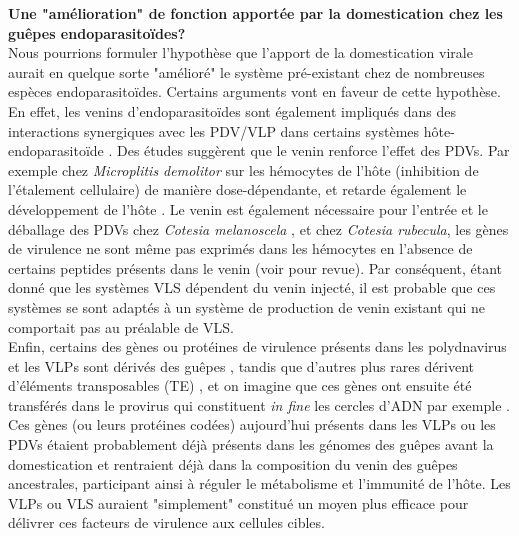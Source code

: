 \textbf{Une "amélioration" de fonction apportée par la domestication chez les guêpes endoparasitoïdes?}\\
Nous pourrions formuler l'hypothèse que l'apport de la domestication virale aurait en quelque sorte "amélioré" le système pré-existant chez de nombreuses espèces endoparasitoïdes. Certains arguments vont en faveur de cette hypothèse. En effet, les venins d'endoparasitoïdes sont également impliqués dans des interactions synergiques avec les PDV/VLP dans certains systèmes hôte-endoparasitoïde \citep{asgari_venom_2006,asgari_venom_2011,schmidt_innate_2001}. Des études suggèrent que le venin renforce l'effet des PDVs. Par exemple chez \textit{Microplitis demolitor} sur les hémocytes de l'hôte (inhibition de l'étalement cellulaire) de manière dose-dépendante, et retarde également le développement de l'hôte \citep{strand_developmental_1991,strand_alterations_1991}. Le venin est également nécessaire pour l'entrée et le déballage des PDVs chez \textit{Cotesia melanoscela} \citep{stoltz_venom_1988}, et chez \textit{Cotesia rubecula}, les gènes de virulence ne sont même pas exprimés dans les hémocytes en l'absence de certains peptides présents dans le venin \citep{zhang_novel_2004} (voir \citep{moreau_venom_2015} pour revue). Par conséquent, étant donné que les systèmes VLS dépendent du venin injecté, il est probable que ces systèmes se sont adaptés à un système de production de venin existant qui ne comportait pas au préalable de VLS.\\

Enfin, certains des gènes ou protéines de virulence présents dans les polydnavirus et les VLPs sont dérivés des guêpes \citep{desjardins_comparative_2008,burke_systematic_2014, huguet_evolution_2012}, tandis que d'autres plus rares dérivent d'éléments transposables (TE) \citep{zhang_chromosome-level_2019, gauthier_chromosomal_2021}, et on imagine que ces gènes ont ensuite été transférés dans le provirus qui constituent \textit{in fine} les cercles d'ADN par exemple \citep{herniou_when_2013}. Ces gènes (ou leurs protéines codées) aujourd'hui présents dans les VLPs ou les PDVs étaient probablement déjà présents dans les génomes des guêpes avant la domestication et  rentraient déjà dans la composition du venin des guêpes ancestrales, participant ainsi à réguler le métabolisme et l'immunité de l'hôte. Les VLPs ou VLS auraient "simplement" constitué un moyen plus efficace pour délivrer ces facteurs de virulence aux cellules cibles. \\

